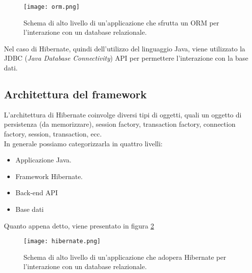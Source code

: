 \begin{figure}[H]
	\centering
	\texttt{[image: orm.png]}
	\caption{Schema di alto livello di un'applicazione che sfrutta un ORM per l'interazione con un database relazionale.}	
	\label{fig:orm}
\end{figure}

Nel caso di Hibernate, quindi dell'utilizzo del linguaggio Java, viene utilizzato la JDBC (\textit{Java Database Connectivity}) API per permettere l'interazione con la base dati.

\subsection{Architettura del framework}
L'architettura di Hibernate coinvolge diversi tipi di oggetti, quali un oggetto di persistenza (da memorizzare), session factory, transaction factory, connection factory, session, transaction, ecc.\\ 
In generale possiamo categorizzarla in quattro livelli:
\begin{itemize}
    \item Applicazione Java.
    \item Framework Hibernate.
    \item Back-end API
    \item Base dati
\end{itemize}
Quanto appena detto, viene presentato in figura \ref{fig:hibernate}

\begin{figure}[H]
    \centering
	\texttt{[image: hibernate.png]}
	\caption{Schema di alto livello di un'applicazione che adopera Hibernate per l'interazione con un database relazionale.}	
	\label{fig:hibernate}
\end{figure}